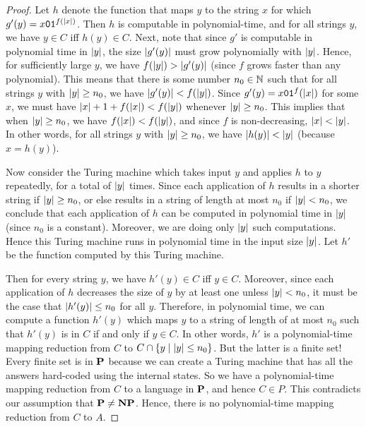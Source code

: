 \begin{proof}
  Let $h$ denote the function that maps $y$ to the string $x$ for which $g'(y) = x\texttt{0}\texttt{1}^{f(| x |)}$. Then $h$ is computable in polynomial-time, and for all strings $y$, we have $y \in C$ iff $h(y) \in C$. Next, note that since $g'$ is computable in polynomial time in $| y |$, the size $| g'(y) |$ must grow polynomially with $| y |$. Hence, for sufficiently large $y$, we have $f(| y |) > | g'(y) |$ (since $f$ grows faster than any polynomial). This means that there is some number $n_0 \in \mathbb N$ such that for all strings $y$ with $| y | \geq n_0$, we have $| g'(y) | < f(| y |)$. Since $g'(y) = x\texttt{0}\texttt{1}^f(| x |)$ for some $x$, we must have $| x | + 1 + f(| x |) < f(| y |)$ whenever $| y | \geq n_0$. This implies that when $| y | \geq n_0$, we have $f(| x |) < f(| y |)$, and since $f$ is non-decreasing, $| x | < | y |$. In other words, for all strings $y$ with $| y | \geq n_0$, we have $| h(y) | < | y |$ (because $x = h(y)$).

  Now consider the Turing machine which takes input $y$ and applies $h$ to $y$ repeatedly, for a total of $| y |$ times. Since each application of $h$ results in a shorter string if $| y | \geq n_0$, or else results in a string of length at most $n_0$ if $| y | < n_0$, we conclude that each application of $h$ can be computed in polynomial time in $| y |$ (since $n_0$ is a constant). Moreover, we are doing only $| y |$ such computations. Hence this Turing machine runs in polynomial time in the input size $| y |$. Let $h'$ be the function computed by this Turing machine.

  Then for every string $y$, we have $h'(y) \in C$ iff $y \in C$. Moreover, since each application of $h$ decreases the size of $y$ by at least one unless $| y | < n_0$, it must be the case that $| h'(y) | \leq n_0$ for all $y$. Therefore, in polynomial time, we can compute a function $h'(y)$ which maps $y$ to a string of length of at most $n_0$ such that $h'(y)$ is in $C$ if and only if $y \in C$. In other words, $h'$ is a polynomial-time mapping reduction from $C$ to $C \cap \{ y \mid | y | \leq n_0 \}$. But the latter is a finite set! Every finite set is in $\textbf{P}$ because we can create a Turing machine that has all the answers hard-coded using the internal states. So we have a polynomial-time mapping reduction from $C$ to a language in $\textbf{P}$, and hence $C \in P$. This contradicts our assumption that $\textbf{P} \neq \textbf{NP}$. Hence, there is no polynomial-time mapping reduction from $C$ to $A$.
\end{proof}

